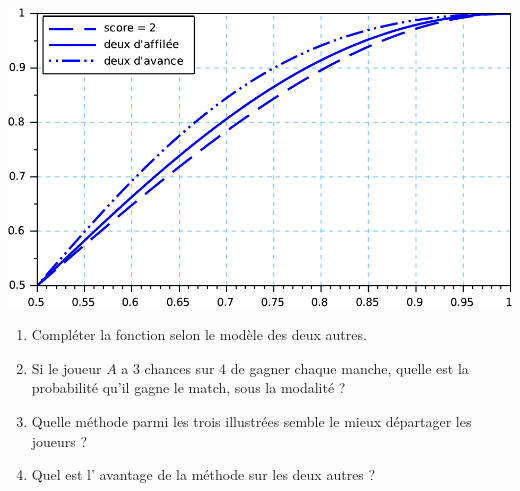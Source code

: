 \documentclass[12pt]{article}
\begin{document}
\begin{objetGauche}
  \begin{minipage}[t]{7cm}
    
    \includegraphics[width=\linewidth]{comparaisonDesTroisGrille.pdf}
  \end{minipage}
  \finObjet
  
\end{objetGauche}
\begin{enumerate}[resume]
  \item Compléter  la fonction  selon le modèle des deux autres.
  \item Si le joueur $A$ a 3 chances sur $4$ de gagner chaque manche, quelle est la probabilité qu'il gagne le match, sous la modalité  ?
  \item Quelle méthode parmi les trois illustrées semble le mieux départager les joueurs ?
  \item Quel est l' avantage  de la méthode  sur les deux autres ?
\end{enumerate}
\end{document}
